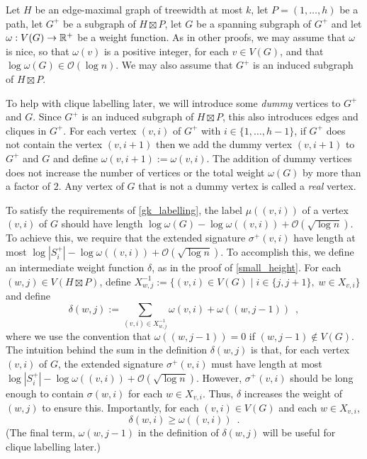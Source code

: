 \documentclass{patmorin}
\renewcommand{\ge}{\geqslant}
\newcommand{\defin}[1]{\emph{\textcolor{brightmaroon}{#1}}}
\newcommand{\Oh}{\calO}
\newcommand{\calO}{\mathcal{O}}
\begin{document}
  Let $H$ be an edge-maximal graph of treewidth at most $k$, let $P=(1,\ldots,h)$ be a path, let $G^+$ be a subgraph of $H\boxtimes P$, let $G$ be a spanning subgraph of $G^+$ and let $\omega:V(G)\to\mathbb{R}^+$ be a weight function.  As in other proofs, we may assume that $\omega$ is nice, so that $\omega(v)$ is a positive integer, for each $v\in V(G)$, and that $\log\omega(G)\in\Oh(\log n)$.  We may also assume that $G^+$ is an induced subgraph of $H\boxtimes P$.  
  
  To help with clique labelling later, we will introduce some \defin{dummy} vertices to $G^+$ and $G$.  Since $G^+$ is an induced subgraph of $H\boxtimes P$, this also introduces edges and cliques in $G^+$.  For each vertex $(v,i)$ of $G^+$ with $i\in\{1,\ldots,h-1\}$, if $G^+$ does not contain the vertex $(v,i+1)$ then we add the dummy vertex $(v,i+1)$ to $G^+$ and $G$ and define $\omega(v,i+1):=\omega(v,i)$.  The addition of dummy vertices does not increase the number of vertices or the total weight $\omega(G)$ by more than a factor of $2$.  Any vertex of $G$ that is not a dummy vertex is called a \defin{real} vertex.

  To satisfy the requirements of \cref{gk_labelling}, the label $\mu((v,i))$ of a vertex $(v,i)$ of $G$ should have length $\log \omega(G)-\log\omega((v,i)) + \Oh(\sqrt{\log n})$.  To achieve this, we require that the extended signature $\sigma^+(v,i)$ have length at most $\log|S_i^+|-\log\omega((v,i)) + \Oh(\sqrt{\log n})$.  To accomplish this, we define an intermediate weight function $\delta$, as in the proof of \cref{small_height}.  For each $(w,j)\in V(H\boxtimes P)$, define $X^{-1}_{w,j}:=\{(v,i)\in V(G)\mid i\in\{j,j+1\},\; w\in X_{v,i}\}$ and define
  \[
    \delta(w,j):=\sum_{(v,i)\in X^{-1}_{w,j}}\omega(v,i) + \omega((w,j-1)) \enspace ,
  \]
  where we use the convention that $\omega((w,j-1))=0$ if $(w,j-1)\not\in V(G)$.
  The intuition behind the sum in the definition $\delta(w,j)$ is that, for each vertex $(v,i)$ of $G$, the extended signature $\sigma^+(v,i)$ must have length at most $\log|S^+_i|-\log\omega((v,i))+\Oh(\sqrt{\log n})$.  However, $\sigma^+(v,i)$ should be long enough to contain $\sigma(w,i)$ for each $w\in X_{v,i}$.  Thus, $\delta$ increases the weight of $(w,j)$ to ensure this.
  Importantly, for each $(v,i)\in V(G)$ and each $w\in X_{v,i}$,
  \begin{equation}
    \delta(w,i) \ge \omega((v,i)) \enspace . \label{delta_v_omega}
  \end{equation}
  (The final term, $\omega(w,j-1)$ in the definition of $\delta(w,j)$ will be useful for clique labelling later.)
\end{document}

